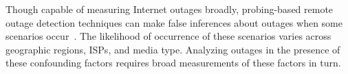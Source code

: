 
Though capable of measuring Internet outages broadly, probing-based
remote outage detection techniques can make false inferences about
outages when some scenarios occur~\cite{timeouts,
addrchange-reasons}. The likelihood of occurrence of these scenarios
varies across geographic regions, ISPs, and media type. Analyzing
outages in the presence of these confounding factors requires broad
measurements of these factors in turn.









